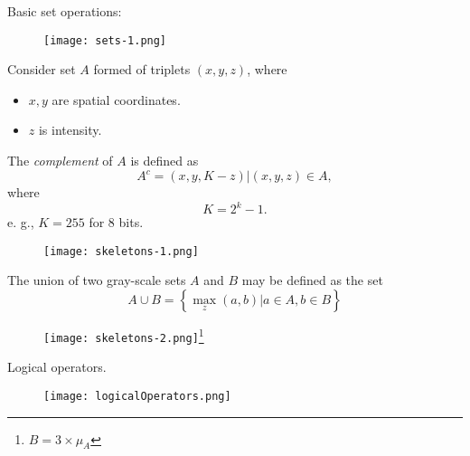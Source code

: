 
\begin{frame}
Basic set operations:
\begin{figure}
\centering
\texttt{[image: sets-1.png]}
\end{figure}
\end{frame}


\begin{frame}
Consider set $A$ formed of triplets $(x,y,z)$, where
\begin{itemize}
\item $x, y$ are spatial coordinates.
\item $z$ is intensity.
\end{itemize}
The \textit{complement} of $A$ is defined as
\[
A^{c}={(x,y,K-z)|(x,y,z)\in A},
\]
where
\[
K=2^{k}-1.
\]
e. g., $K = 255$ for 8 bits.
\end{frame}


\begin{frame}
\begin{figure}
\centering
\texttt{[image: skeletons-1.png]}
\end{figure}
\end{frame}


\begin{frame}
The union of two gray-scale sets $A$ and $B$ may be defined as the set
\begin{equation}
A\cup B = \left \{ \max_z (a,b)| a\in A, b\in B \right \}
\end{equation}
\begin{figure}
\centering
\texttt{[image: skeletons-2.png]}\footnote{$B=3\times \mu_{A}$}
\end{figure}
\end{frame}


\begin{frame}
Logical operators.
\begin{figure}
\centering
\texttt{[image: logicalOperators.png]}
\end{figure}
\end{frame}

